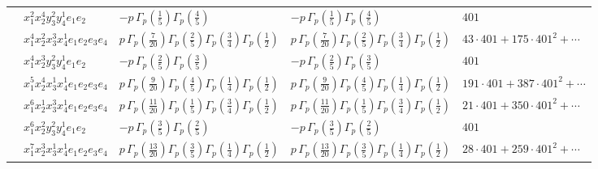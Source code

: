 \documentclass[11pt]{article}
\begin{document}
\begin{table}[ht]
{\begin{tabular}{@{}lllll@{}}
 & $x_{1}^{2} x_{2}^{4} y_{3}^{2} y_{4}^{1} e_{1} e_{2}$ & $- p \, \Gamma_p \left( \frac{1}{5} \right) \Gamma_p \left( \frac{4}{5} \right)$ & $- p \, \Gamma_p \left( \frac{1}{5} \right) \Gamma_p \left( \frac{4}{5} \right)$ & $401$ \\
 & $x_{1}^{4} x_{2}^{2} x_{3}^{3} x_{4}^{1}  e_{1} e_{2} e_{3} e_{4}$ & $p \, \Gamma_p \left( \frac{7}{20} \right) \Gamma_p \left( \frac{2}{5} \right) \Gamma_p \left( \frac{3}{4} \right) \Gamma_p \left( \frac{1}{2} \right)$ & $p \, \Gamma_p \left( \frac{7}{20} \right) \Gamma_p \left( \frac{2}{5} \right) \Gamma_p \left( \frac{3}{4} \right) \Gamma_p \left( \frac{1}{2} \right)$ & $43{\cdot}401{+}175{\cdot}401^{2}{+}\cdots$ \\
 & $x_{1}^{4} x_{2}^{3} y_{3}^{2} y_{4}^{1} e_{1} e_{2}$ & $- p \, \Gamma_p \left( \frac{2}{5} \right) \Gamma_p \left( \frac{3}{5} \right)$ & $- p \, \Gamma_p \left( \frac{2}{5} \right) \Gamma_p \left( \frac{3}{5} \right)$ & $401$ \\
 & $x_{1}^{5} x_{2}^{4} x_{3}^{1} x_{4}^{1}  e_{1} e_{2} e_{3} e_{4}$ & $p \, \Gamma_p \left( \frac{9}{20} \right) \Gamma_p \left( \frac{4}{5} \right) \Gamma_p \left( \frac{1}{4} \right) \Gamma_p \left( \frac{1}{2} \right)$ & $p \, \Gamma_p \left( \frac{9}{20} \right) \Gamma_p \left( \frac{4}{5} \right) \Gamma_p \left( \frac{1}{4} \right) \Gamma_p \left( \frac{1}{2} \right)$ & $191{\cdot}401{+}387{\cdot}401^{2}{+}\cdots$ \\
 & $x_{1}^{6} x_{2}^{1} x_{3}^{3} x_{4}^{1}  e_{1} e_{2} e_{3} e_{4}$ & $p \, \Gamma_p \left( \frac{11}{20} \right) \Gamma_p \left( \frac{1}{5} \right) \Gamma_p \left( \frac{3}{4} \right) \Gamma_p \left( \frac{1}{2} \right)$ & $p \, \Gamma_p \left( \frac{11}{20} \right) \Gamma_p \left( \frac{1}{5} \right) \Gamma_p \left( \frac{3}{4} \right) \Gamma_p \left( \frac{1}{2} \right)$ & $21{\cdot}401{+}350{\cdot}401^{2}{+}\cdots$ \\
 & $x_{1}^{6} x_{2}^{2} y_{3}^{2} y_{4}^{1} e_{1} e_{2}$ & $- p \, \Gamma_p \left( \frac{3}{5} \right) \Gamma_p \left( \frac{2}{5} \right)$ & $- p \, \Gamma_p \left( \frac{3}{5} \right) \Gamma_p \left( \frac{2}{5} \right)$ & $401$ \\
 & $x_{1}^{7} x_{2}^{3} x_{3}^{1} x_{4}^{1}  e_{1} e_{2} e_{3} e_{4}$ & $p \, \Gamma_p \left( \frac{13}{20} \right) \Gamma_p \left( \frac{3}{5} \right) \Gamma_p \left( \frac{1}{4} \right) \Gamma_p \left( \frac{1}{2} \right)$ & $p \, \Gamma_p \left( \frac{13}{20} \right) \Gamma_p \left( \frac{3}{5} \right) \Gamma_p \left( \frac{1}{4} \right) \Gamma_p \left( \frac{1}{2} \right)$ & $28{\cdot}401{+}259{\cdot}401^{2}{+}\cdots$ \\

\end{tabular}}
\end{table}
\end{document}
